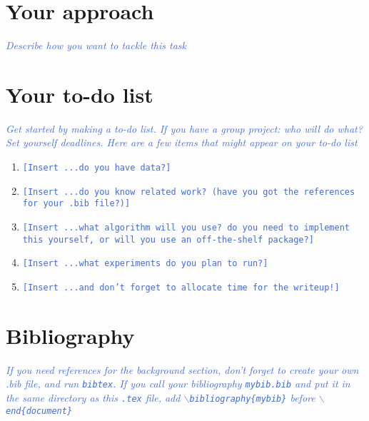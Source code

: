 \documentclass[11pt,letterpaper]{article}
\newcommand{\blue}[1]{\textcolor{RoyalBlue}{#1}}
\newcommand{\fillme}[1]{\blue{\texttt{[Insert #1]}}}
\newcommand{\instructions}[1]{\blue{\textit{#1}}}
\begin{document}
\section*{Your approach} 
\instructions{Describe how you want to tackle this task}

\section*{Your to-do list}
\instructions{Get started by making a to-do list. If you have a group
  project: who will do what? Set yourself deadlines. Here are a few
  items that might appear on your to-do list}
\begin{enumerate}
\item \fillme{...do you have data?}
\item \fillme{...do you know related work? (have you got the
    references  for your .bib file?)}
\item \fillme{...what algorithm will you use? do you need to implement
    this yourself, or will you use an off-the-shelf package?} 
\item \fillme{...what experiments do you plan to run?}
\item \fillme{...and don't forget to allocate time for the writeup!} 
\end{enumerate}

\section*{Bibliography}
\instructions{If you need references for the background section, don't forget to create your own .bib file, and run {\tt bibtex}. If you call your bibliography {\tt mybib.bib} and put it in the same directory as this {\tt .tex} file, add {\tt$\backslash$bibliography\{mybib\}} before {\tt$\backslash$end\{document\}}
}
  
\end{document}
